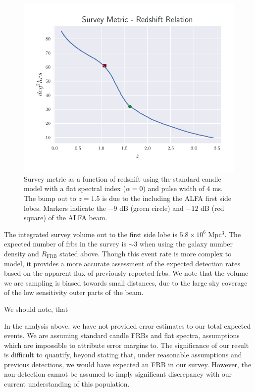 \documentclass[a4paper,fleqn,usenatbib]{mnras}
\begin{document}
\begin{figure}
    \includegraphics[width=1.0\linewidth]{figures/full_sefd_z_relation.pdf}
    \caption{Survey metric as a function of redshift using the standard candle
    model with a flat spectral index ($\alpha=0$) and pulse width of 4 ms. The
    bump out to $z=1.5$ is due to the including the ALFA first side lobes.
    Markers indicate the $-9$ dB (green circle) and $-12$ dB (red square) of the
    ALFA beam.
    }
    \label{fig:full_sefd_z}
\end{figure}

The integrated survey volume out to the first side lobe is $5.8 \times
10^6$ Mpc$^3$. The expected number of \glspl{frb} in the survey is
$\sim 3$ when using the galaxy number density and $R_{\textrm{FRB}}$
stated above. Though this event rate is more complex to model, it
provides a more accurate assessment of the expected detection rates
based on the apparent flux of previously reported \glspl{frb}. We note
that the volume we are sampling is biased towards small distances, due
to the large sky coverage of the low sensitivity outer parts of the
beam.

We should note, that 




In the analysis above, we have not provided error estimates to our
total expected events. We are assuming standard candle FRBs and flat
spectra, assumptions which are impossible to attribute error margins
to. The significance of our result is difficult to quantify, beyond
stating that, under reasonable assumptions and previous detections, we
would have expected an FRB in our survey. However, the non-detection
cannot be assumed to imply significant discrepancy with our current
understanding of this population.
\end{document}
